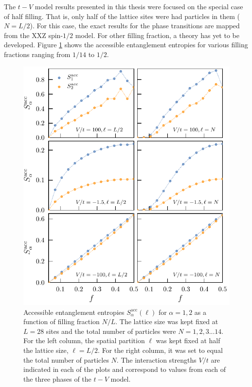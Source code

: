 	The $t-V$ model results presented in this thesis were focused on the special case of half filling. That is, only half of the lattice sites were had particles in them ($N = L/2$). For this case, the exact results for the phase transitions are mapped from the XXZ spin-$1/2$ model. For other filling fraction, a theory has yet to be developed. Figure \ref{fig:fillingFractionDependence} shows the accessible entanglement entropies for various filling fractions ranging from $1/14$ to $1/2$. 
	
	\begin{figure}[h!]
	\begin{center}
	\includegraphics[scale=1.0]{fillingFractionDependence.pdf}
	\end{center}
	\caption{Accessible entanglement entropies $S_{\alpha}^{\mathrm{acc}}(\ell)$ for $		\alpha = 1,2$ as a function of filling fraction $N/L$. The lattice size was kept fixed at 		$L=28$ sites and the total number of particles were $N=1,2,3...14$. For the left column, 	the spatial partition $\ell$ was kept fixed at half the lattice size, $\ell = L/2$. For the right 	column, it was set to equal the total number of particles $N$. The interaction strengths 	$V/t$ are indicated in each of the plots and correspond to values from each of the three 	phases of the $t-V$ model.}
	\label{fig:fillingFractionDependence}
	\end{figure}
	
